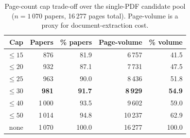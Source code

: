 \begin{table}[t]
  \centering
  \caption{Page-count cap trade-off over the single-PDF candidate pool ($n=1\,070$ papers, 16\,277 pages total). Page-volume is a proxy for document-extraction cost.}
  \label{tab:page-cap-tradeoff}
  \begin{tabular}{@{}r r r r r@{}}
    \toprule
    Cap & Papers & \% papers & Page-volume & \% volume \\
    \midrule
    $\le 15$ & 876 & 81.9 & 6\,757 & 41.5 \\
    $\le 20$ & 932 & 87.1 & 7\,731 & 47.5 \\
    $\le 25$ & 963 & 90.0 & 8\,436 & 51.8 \\
    \textbf{$\le 30$} & \textbf{981} & \textbf{91.7} & \textbf{8\,929} & \textbf{54.9} \\
    $\le 40$ & 1\,000 & 93.5 & 9\,602 & 59.0 \\
    $\le 50$ & 1\,014 & 94.8 & 10\,237 & 62.9 \\
    none & 1\,070 & 100.0 & 16\,277 & 100.0 \\
    \bottomrule
  \end{tabular}
\end{table}